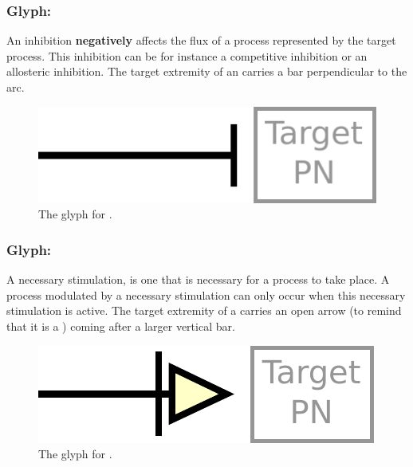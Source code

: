 
\subsubsection{Glyph: }\label{sec:inhibition}

An inhibition \textbf{negatively} affects the flux of a process represented by the target process. This inhibition can be for instance a competitive inhibition or an allosteric inhibition. The target extremity of an  carries a bar perpendicular to the arc.

\begin{figure}[htb]
  \centering
  \includegraphics[scale = 0.5]{le_images/inhibition}
  \caption{The \PD glyph for .}
  \label{fig:inhibition}
\end{figure}





\subsubsection{Glyph: }\label{sec:necessary_stim}

A necessary stimulation, is one that is necessary for a process to take place. A process modulated by a necessary stimulation can only occur when this necessary stimulation is active. The target extremity of a  carries an open arrow (to remind that it is a ) coming after a larger vertical bar.

\begin{figure}[htb]
  \centering
  \includegraphics[scale = 0.5]{le_images/necessary_stim}
  \caption{The \PD glyph for .}
  \label{fig:Necessary Stimulation}
\end{figure}

